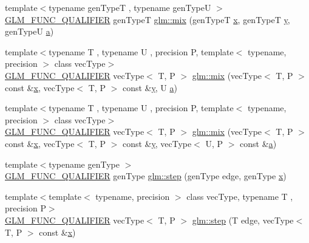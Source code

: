 \begin{DoxyCompactItemize}
\item 
{\footnotesize template$<$typename gen\+TypeT , typename gen\+TypeU $>$ }\\\mbox{\hyperlink{setup_8hpp_a33fdea6f91c5f834105f7415e2a64407}{G\+L\+M\+\_\+\+F\+U\+N\+C\+\_\+\+Q\+U\+A\+L\+I\+F\+I\+ER}} gen\+TypeT \mbox{\hyperlink{group__core__func__common_ga8e93f374aae27d1a88b921860351f8d4}{glm\+::mix}} (gen\+TypeT \mbox{\hyperlink{glad_8h_a92d0386e5c19fb81ea88c9f99644ab1d}{x}}, gen\+TypeT \mbox{\hyperlink{glad_8h_a66ddd433d2cacfe27f5906b7e86faeed}{y}}, gen\+TypeU \mbox{\hyperlink{glad_8h_ac8729153468b5dcf13f971b21d84d4e5}{a}})
\item 
{\footnotesize template$<$typename T , typename U , precision P, template$<$ typename, precision $>$ class vec\+Type$>$ }\\\mbox{\hyperlink{setup_8hpp_a33fdea6f91c5f834105f7415e2a64407}{G\+L\+M\+\_\+\+F\+U\+N\+C\+\_\+\+Q\+U\+A\+L\+I\+F\+I\+ER}} vec\+Type$<$ T, P $>$ \mbox{\hyperlink{group__core__func__common_gaa51ef964cbf80ee9c2364d629693c8c8}{glm\+::mix}} (vec\+Type$<$ T, P $>$ const \&\mbox{\hyperlink{glad_8h_a92d0386e5c19fb81ea88c9f99644ab1d}{x}}, vec\+Type$<$ T, P $>$ const \&\mbox{\hyperlink{glad_8h_a66ddd433d2cacfe27f5906b7e86faeed}{y}}, U \mbox{\hyperlink{glad_8h_ac8729153468b5dcf13f971b21d84d4e5}{a}})
\item 
{\footnotesize template$<$typename T , typename U , precision P, template$<$ typename, precision $>$ class vec\+Type$>$ }\\\mbox{\hyperlink{setup_8hpp_a33fdea6f91c5f834105f7415e2a64407}{G\+L\+M\+\_\+\+F\+U\+N\+C\+\_\+\+Q\+U\+A\+L\+I\+F\+I\+ER}} vec\+Type$<$ T, P $>$ \mbox{\hyperlink{group__core__func__common_gadccbaffe46f369cf1a96b2aef92cbfdd}{glm\+::mix}} (vec\+Type$<$ T, P $>$ const \&\mbox{\hyperlink{glad_8h_a92d0386e5c19fb81ea88c9f99644ab1d}{x}}, vec\+Type$<$ T, P $>$ const \&\mbox{\hyperlink{glad_8h_a66ddd433d2cacfe27f5906b7e86faeed}{y}}, vec\+Type$<$ U, P $>$ const \&\mbox{\hyperlink{glad_8h_ac8729153468b5dcf13f971b21d84d4e5}{a}})
\item 
{\footnotesize template$<$typename gen\+Type $>$ }\\\mbox{\hyperlink{setup_8hpp_a33fdea6f91c5f834105f7415e2a64407}{G\+L\+M\+\_\+\+F\+U\+N\+C\+\_\+\+Q\+U\+A\+L\+I\+F\+I\+ER}} gen\+Type \mbox{\hyperlink{group__core__func__common_ga015a1261ff23e12650211aa872863cce}{glm\+::step}} (gen\+Type edge, gen\+Type \mbox{\hyperlink{glad_8h_a92d0386e5c19fb81ea88c9f99644ab1d}{x}})
\item 
{\footnotesize template$<$template$<$ typename, precision $>$ class vec\+Type, typename T , precision P$>$ }\\\mbox{\hyperlink{setup_8hpp_a33fdea6f91c5f834105f7415e2a64407}{G\+L\+M\+\_\+\+F\+U\+N\+C\+\_\+\+Q\+U\+A\+L\+I\+F\+I\+ER}} vec\+Type$<$ T, P $>$ \mbox{\hyperlink{group__core__func__common_gaf15b74ab672af2c7d7b535a9b4803700}{glm\+::step}} (T edge, vec\+Type$<$ T, P $>$ const \&\mbox{\hyperlink{glad_8h_a92d0386e5c19fb81ea88c9f99644ab1d}{x}})

\end{DoxyCompactItemize}
